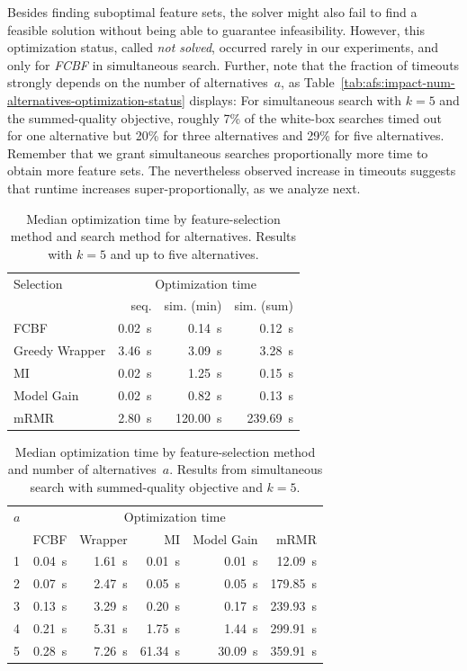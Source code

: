 \documentclass{article}
\theoremstyle{definition}
\begin{document}
Besides finding suboptimal feature sets, the solver might also fail to find a feasible solution without being able to guarantee infeasibility.
However, this optimization status, called \emph{not solved}, occurred rarely in our experiments, and only for \emph{FCBF} in simultaneous search.
Further, note that the fraction of timeouts strongly depends on the number of alternatives~$a$, as Table~\ref{tab:afs:impact-num-alternatives-optimization-status} displays:
For simultaneous search with $k=5$ and the summed-quality objective, roughly 7\% of the white-box searches timed out for one alternative but 20\% for three alternatives and 29\% for five alternatives.
Remember that we grant simultaneous searches proportionally more time to obtain more feature sets.
The nevertheless observed increase in timeouts suggests that runtime increases super-proportionally, as we analyze next.

\begin{table}[htb]
	\centering
	\begin{tabular}{lrrr}
		\toprule
		Selection & \multicolumn{3}{c}{Optimization time} \\
		\cmidrule(r){2-4}
		& seq. & sim. (min) & sim. (sum) \\
		\midrule
		FCBF & 0.02~s & 0.14~s & 0.12~s \\
		Greedy Wrapper & 3.46~s & 3.09~s & 3.28~s \\
		MI & 0.02~s & 1.25~s & 0.15~s \\
		Model Gain & 0.02~s & 0.82~s & 0.13~s \\
		mRMR & 2.80~s & 120.00~s & 239.69~s \\
		\bottomrule
	\end{tabular}
	\caption{
		Median optimization time by feature-selection method and search method for alternatives.
		Results with $k=5$ and up to five alternatives.
	}
	\label{tab:afs:impact-search-fs-method-optimization-time}
\end{table}
%
\begin{table}[htb]
	\centering
	\begin{tabular}{lrrrrr}
		\toprule
		$a$ & \multicolumn{5}{c}{Optimization time} \\
		\cmidrule(r){2-6}
		& FCBF & Wrapper & MI & Model Gain & mRMR \\
		\midrule
		1 & 0.04~s & 1.61~s & 0.01~s & 0.01~s & 12.09~s \\
		2 & 0.07~s & 2.47~s & 0.05~s & 0.05~s & 179.85~s \\
		3 & 0.13~s & 3.29~s & 0.20~s & 0.17~s & 239.93~s \\
		4 & 0.21~s & 5.31~s & 1.75~s & 1.44~s & 299.91~s \\
		5 & 0.28~s & 7.26~s & 61.34~s & 30.09~s & 359.91~s \\
		\bottomrule
	\end{tabular}
	\caption{
		Median optimization time by feature-selection method and number of alternatives~$a$.
		Results from simultaneous search with summed-quality objective and $k=5$.
	}
	\label{tab:afs:impact-num-alternatives-fs-method-optimization-time}
\end{table}
\end{document}
